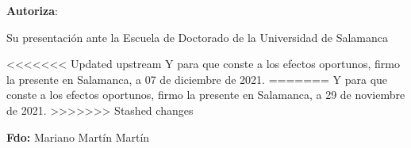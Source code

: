 \bigskip
\textbf{Autoriza}:
\bigskip

Su presentación ante la Escuela de Doctorado de la Universidad de Salamanca

\bigskip

<<<<<<< Updated upstream
Y para que conste a los efectos oportunos, firmo la presente en Salamanca, a 07 de diciembre de 2021. 
=======
Y para que conste a los efectos oportunos, firmo la presente en Salamanca, a 29 de noviembre de 2021. 
>>>>>>> Stashed changes

\bigskip

\bigskip

\bigskip

\bigskip

\bigskip

%
%
%
%


\textbf{Fdo:} Mariano Martín Martín 


%	

